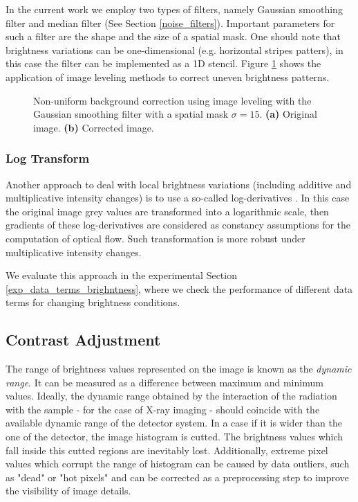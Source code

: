 In the current work we employ two types of filters, namely Gaussian smoothing filter and median filter (See Section \ref{noise_filters}). Important parameters for such a filter are the shape and the size of a spatial mask.  One should note that brightness variations can be one-dimensional (e.g. horizontal stripes patters), in this case the filter can be implemented as a 1D stencil. Figure \ref{fig:image_leveling} shows the application of image leveling methods to correct uneven brightness patterns.

\begin{figure}[ht]
  \centerline{
    \mbox{}
    \hspace{3pt}
    \mbox{}
  }
  \caption[Noise filterst]{Non-uniform background correction using image leveling with the Gaussian smoothing filter with a spatial mask $\sigma=15$. \textbf{(a)} Original image. \textbf{(b)} Corrected image. }
  \label{fig:image_leveling}
\end{figure}




\subsubsection{Log Transform}

Another approach to deal with local brightness variations (including additive and multiplicative intensity changes) is to use a so-called log-derivatives \cite{Mileva07}.
In this case the original image grey values are transformed into a logarithmic scale, then gradients of these log-derivatives are considered as constancy assumptions for the computation of optical flow. Such transformation is more robust under multiplicative intensity changes.

We evaluate this approach in the experimental Section \ref{exp_data_terms_brighntness}, where we check the performance of different data terms for changing brightness conditions. 




\subsection{Contrast Adjustment}
\label{contrast_adjustment}

The range of brightness values represented on the image is known as the \textit{dynamic range}. It can be measured as a difference between maximum and minimum values. Ideally, the dynamic range obtained by the interaction of the radiation with the sample - for the case of X-ray imaging - should coincide with the available  dynamic range of the detector system. In a case if it is wider than the one of the detector, the image histogram is cutted. The brightness values which fall inside this cutted regions are inevitably lost. Additionally, extreme pixel values which corrupt the range of histogram can be caused by data outliers, such as "dead" or "hot pixels" and can be corrected as a preprocessing step to improve the visibility of image details.

